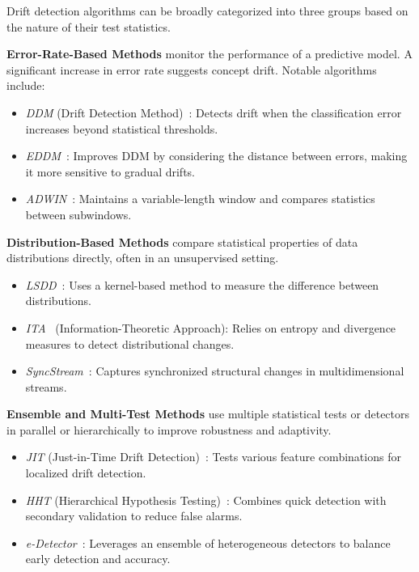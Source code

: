 Drift detection algorithms can be broadly categorized into three groups based
on the nature of their test statistics.

\textbf{Error-Rate-Based Methods} monitor the performance of a predictive model.
A significant increase in error rate suggests concept drift.
Notable algorithms include:

\begin{itemize}
    \item \emph{DDM} (Drift Detection Method)~\cite{ddm}: Detects drift when the
          classification error increases beyond statistical thresholds.
    \item \emph{EDDM}~\cite{eddm}: Improves DDM by considering the distance between errors,
          making it more sensitive to gradual drifts.
    \item \emph{ADWIN}~\cite{adwin}: Maintains a variable-length window and compares
          statistics between subwindows.
\end{itemize}

\textbf{Distribution-Based Methods} compare statistical properties of data distributions directly,
often in an unsupervised setting.

\begin{itemize}
    \item \emph{LSDD}~\cite{lsdd}: Uses a kernel-based method to measure the difference
          between distributions.
    \item \emph{ITA}~\cite{ita} (Information-Theoretic Approach): Relies on entropy and divergence
          measures to detect distributional changes.
    \item \emph{SyncStream}~\cite{syncstream}: Captures synchronized structural changes in multidimensional streams.
\end{itemize}

\textbf{Ensemble and Multi-Test Methods} use multiple statistical tests or detectors in parallel or
hierarchically to improve robustness and adaptivity.

\begin{itemize}
    \item \emph{JIT} (Just-in-Time Drift Detection)~\cite{jit}: Tests various feature combinations
          for localized drift detection.
    \item \emph{HHT} (Hierarchical Hypothesis Testing)~\cite{hht}: Combines quick detection with
          secondary validation to reduce false alarms.
    \item \emph{e-Detector}~\cite{e_detector}: Leverages an ensemble of heterogeneous detectors to
          balance early detection and accuracy.
\end{itemize}

